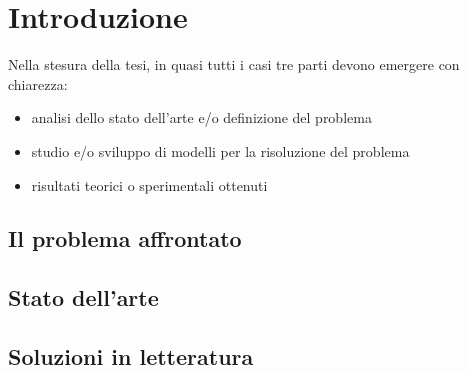 \chapter{Introduzione}


Nella stesura  della tesi, in quasi tutti i casi tre parti devono emergere con chiarezza:
\begin{itemize}
	\item analisi dello stato dell’arte e/o definizione del problema
	\item studio e/o sviluppo di modelli per la risoluzione del problema
	\item risultati teorici o sperimentali ottenuti
\end{itemize} 

\section{Il problema affrontato}

\section{Stato dell'arte}

\section{Soluzioni in letteratura}